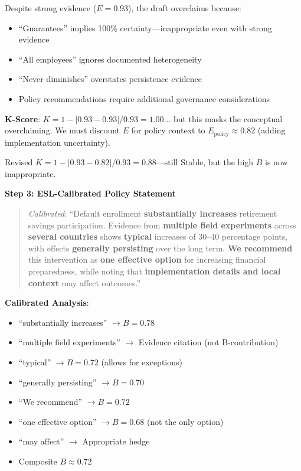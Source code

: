 \documentclass[11pt,a4paper]{article}
\begin{document}
Despite strong evidence ($E = 0.93$), the draft overclaims because:
\begin{itemize}
    \item ``Guarantees'' implies 100\% certainty---inappropriate even with strong evidence
    \item ``All employees'' ignores documented heterogeneity
    \item ``Never diminishes'' overstates persistence evidence
    \item Policy recommendations require additional governance considerations
\end{itemize}

\textbf{K-Score}: $K = 1 - |0.93 - 0.93| / 0.93 = 1.00$... but this masks the conceptual overclaiming. We must discount $E$ for policy context to $E_{\text{policy}} \approx 0.82$ (adding implementation uncertainty).

Revised $K = 1 - |0.93 - 0.82| / 0.93 = 0.88$---still Stable, but the high $B$ is now inappropriate.

\textbf{Step 3: ESL-Calibrated Policy Statement}
\begin{quote}
\textit{Calibrated}: ``Default enrollment \textbf{substantially increases} retirement savings participation. Evidence from \textbf{multiple field experiments} across \textbf{several countries} shows \textbf{typical} increases of 30--40 percentage points, with effects \textbf{generally persisting} over the long term. \textbf{We recommend} this intervention as \textbf{one effective option} for increasing financial preparedness, while noting that \textbf{implementation details and local context} may affect outcomes.''
\end{quote}

\textbf{Calibrated Analysis}:
\begin{itemize}
    \item ``substantially increases'' $\to B = 0.78$
    \item ``multiple field experiments'' $\to$ Evidence citation (not B-contribution)
    \item ``typical'' $\to B = 0.72$ (allows for exceptions)
    \item ``generally persisting'' $\to B = 0.70$
    \item ``We recommend'' $\to B = 0.72$
    \item ``one effective option'' $\to B = 0.68$ (not the only option)
    \item ``may affect'' $\to$ Appropriate hedge
    \item Composite $B \approx 0.72$
\end{itemize}
\end{document}
